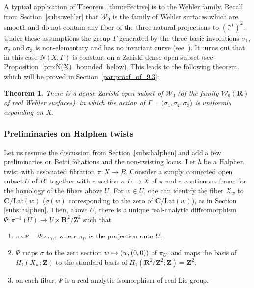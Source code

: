 \documentclass[JEP,XML,SOM,Unicode,published]{cedram}
\newenvironment{enumeratea}
{\bgroup\def\theenumi{\alph{enumi}}\begin{enumerate}}
{\end{enumerate}\egroup}
\newcommand\mto{\mathchoice{\longmapsto}{\mapsto}{\mapsto}{\mapsto}}
\newcommand{\inv}{^{-1}}
\newcommand{\pp}{\mathbb{P}}\let\P\pp
\def\C{\mathbf{C}}
\def\R{\mathbf{R}}
\def\Z{\mathbf{Z}}
\newcommand{\cW}{\mathcal{W}}
\newcommand{\Lat}{{\mathrm{Lat}}}
\theoremstyle{plain}
\newtheorem{thm}{Theorem}[section]
\theoremstyle{definition}
\begin{document}
A typical application of Theorem~\ref{thm:effective} is to the Wehler family.
Recall from Section~\ref{subs:wehler}
that ${ \cW}_0$ is the family of Wehler surfaces which are smooth and do not contain any
fiber of the three natural projections to
$(\pp^1)^2$.
Under these assumptions the group $\Gamma$ generated by the three basic involutions
$\sigma_1$, $\sigma_2$ and $\sigma_3$ is non-elementary and
has no invariant curve (see~\cite[Prop.\,2.2]{finite_orbits}).
It turns out that in this case $N(X, \Gamma)$ is constant on a Zariski
dense open subset (see Proposition~\ref{pro:N(X)_bounded} below).
This leads to the following theorem, which will be proved in Section~\ref{par:proof_of_9.3}:

\begin{thm}\label{thm:wehler_zariski}
There is a dense Zariski open subset of ${ \cW}_0$
(\resp of the family ${ \cW}_0(\R)$ of real Wehler surfaces),
in which the action of $\Gamma=\langle \sigma_1, \sigma_2, \sigma_3\rangle$ is
uniformly expanding on $X$.
\end{thm}

\subsubsection{Preliminaries on Halphen twists}\label{par:preliminaries2_on_Halphen} Let us resume the discussion from Section~\ref{subs:halphen} and add a few preliminaries on Betti foliations and the non-twisting locus. Let $h$ be a Halphen twist with associated fibration $\pi\colon X\to B$.
Consider a simply connected open subset $U$ of $B^\circ$ together with a section $\sigma\colon U\to X$ of $\pi$
and a continuous frame for the homology of the fibers above $U$.
For $w\in U$, one can identify the fiber $X_w$ to $\C/\Lat(w)$ ($\sigma(w)$ corresponding to the zero of $\C/\Lat(w)$), as in Section \ref{subs:halphen}.
Then, above $U$, there is a unique real-analytic diffeomorphism $\Psi: \pi \inv(U)\to U\times \R^2/\Z^2$
such that
\begin{enumeratea}
\item
$\pi\circ \Psi=\Psi\circ \pi_U$, where $\pi_U$ is the projection onto $U$;
\item
$\Psi$ maps $\sigma$ to the zero section $w\mto (w, (0,0))$ of $\pi_U$, and maps the basis of $H_1(X_w;\Z)$ to the standard basis of $H_1(\R^2/\Z^2; \Z)=\Z^2$;
\item
on each fiber, $\Psi$ is a real analytic isomorphism of real Lie group.
\end{enumeratea}
\end{document}
